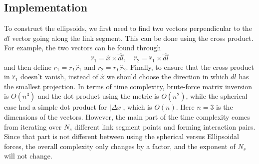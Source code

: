 \documentclass[nofootinbib,preprint,floatfix,titlepage,endfloats,superscriptaddress]{revtex4} %
\begin{document}
\subsection{Implementation}
To construct the ellipsoids, we first need to find two vectors perpendicular to the $dl$ vector going along the link segment. This can be done using the cross product.
For example, the two vectors can be found through 
\begin{equation}
    \hat{r}_1 = \hat{x} \times \hat{dl}, \quad \hat{r}_2 = \hat{r}_1 \times \hat{dl} 
    \label{eq:r12}
\end{equation}
and then define $r_1 = r_L \hat{r}_1$ and $r_2 = r_L \hat{r}_2$. Finally, to ensure that the cross product in $\hat{r}_1$ doesn't vanish, instead of $\hat{x}$ we should choose the direction in which $dl$ has the smallest projection. 
In terms of time complexity, brute-force matrix inversion is $O(n^3)$ and the dot product using the metric is $O(n^2)$, while the spherical case had a simple dot product for $|\Delta x|$, which is $O(n)$. Here $n=3$ is the dimensions of the vectors. 
However, the main part of the time complexity comes from iterating over $N_s$ different link segment points and forming interaction pairs. 
Since that part is not different between using the spherical versus Ellipsoidal forces, the overall complexity only changes by a factor, and the exponent of $N_s$ will not change.
\end{document}
